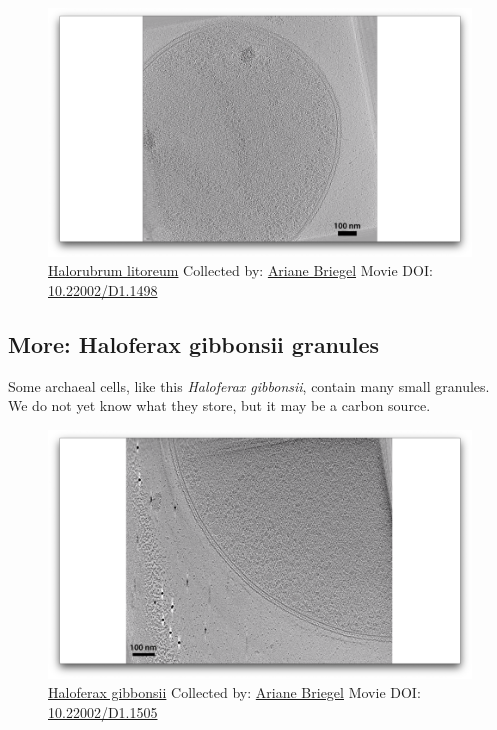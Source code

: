 \documentclass[]{tufte-book}
\begin{document}
\begin{figure}
\includegraphics{movie_stills/4_10} \caption[\protect\hyperlink{tree}{Halorubrum litoreum} Collected by:
\protect\hyperlink{ariane_briegel}{Ariane Briegel} Movie DOI:
\href{https://doi.org/10.22002/D1.1498}{10.22002/D1.1498}]{\protect\hyperlink{tree}{Halorubrum litoreum} Collected by:
\protect\hyperlink{ariane_briegel}{Ariane Briegel} Movie DOI:
\href{https://doi.org/10.22002/D1.1498}{10.22002/D1.1498}}\label{fig:4-10}
\end{figure}

\hypertarget{Haloferax_gibbonsii_granules}{\subsection*{More: Haloferax
gibbonsii granules}\label{Haloferax_gibbonsii_granules}}

Some archaeal cells, like this \emph{Haloferax gibbonsii}, contain many
small granules. We do not yet know what they store, but it may be a
carbon source.





\begin{figure}
\includegraphics{movie_stills/4_10a} \caption[\protect\hyperlink{tree}{Haloferax gibbonsii} Collected by:
\protect\hyperlink{ariane_briegel}{Ariane Briegel} Movie DOI:
\href{https://doi.org/10.22002/D1.1505}{10.22002/D1.1505}]{\protect\hyperlink{tree}{Haloferax gibbonsii} Collected by:
\protect\hyperlink{ariane_briegel}{Ariane Briegel} Movie DOI:
\href{https://doi.org/10.22002/D1.1505}{10.22002/D1.1505}}\label{fig:4-10a}
\end{figure}
\end{document}
